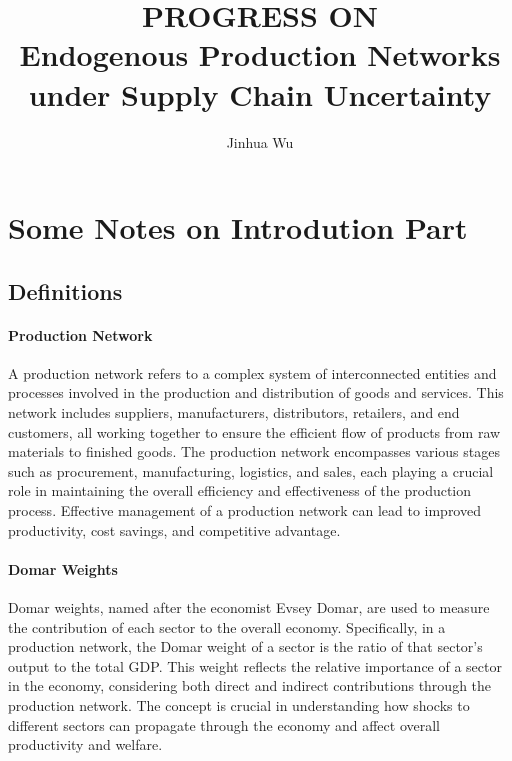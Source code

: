 \documentclass[11pt]{article}
\title{PROGRESS ON \\
	Endogenous Production Networks under Supply Chain Uncertainty}
\author{Jinhua Wu}
\theoremstyle{definition}
\begin{document}
	\maketitle
	\tableofcontents
	\newpage
	
	\section{Some Notes on Introdution Part}
	\subsection{Definitions}
	\paragraph{Production Network} A production network refers to a complex system of interconnected entities and processes involved in the production and distribution of goods and services. This network includes suppliers, manufacturers, distributors, retailers, and end customers, all working together to ensure the efficient flow of products from raw materials to finished goods. The production network encompasses various stages such as procurement, manufacturing, logistics, and sales, each playing a crucial role in maintaining the overall efficiency and effectiveness of the production process. Effective management of a production network can lead to improved productivity, cost savings, and competitive advantage.
	
	\paragraph{Domar Weights} Domar weights, named after the economist Evsey Domar, are used to measure the contribution of each sector to the overall economy. Specifically, in a production network, the Domar weight of a sector is the ratio of that sector's output to the total GDP. This weight reflects the relative importance of a sector in the economy, considering both direct and indirect contributions through the production network. The concept is crucial in understanding how shocks to different sectors can propagate through the economy and affect overall productivity and welfare.
	
\end{document}
